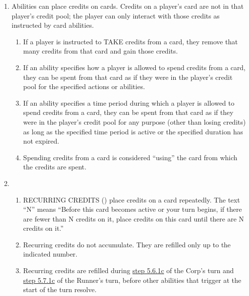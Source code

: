 \begin{enumerate}
\begin{enumerate}
	      \end{enumerate}
	\item Abilities can place credits on cards. Credits on a player's card are not in that player's credit pool; the player can only interact with those credits as instructed by card abilities.
	      \begin{enumerate}
		      \item If a player is instructed to TAKE credits from a card, they remove that many credits from that card and gain those credits.
		      \item If an ability specifies how a player is allowed to spend credits from a card, they can be spent from that card as if they were in the player's credit pool for the specified actions or abilities.
		      \item If an ability specifies a time period during which a player is allowed to spend credits from a card, they can be spent from that card as if they were in the player's credit pool for any purpose (other than losing credits) as long as the specified time period is active or the specified duration has not expired.
		      \item Spending credits from a card is considered ``using'' the card from which the credits are spent.
	      \end{enumerate}
	\item {}
	      \begin{enumerate}
		      \item RECURRING CREDITS (\recurring) place credits on a card repeatedly. The text ``N\recurring'' means ``Before this card becomes active or your turn begins, if there are fewer than N credits on it, place credits on this card until there are N credits on it.''
		      \item Recurring credits do not accumulate. They are refilled only up to the indicated number.
		      \item Recurring credits are refilled during \hyperlink{page.i}{step 5.6.1c} of the Corp's turn and \hyperlink{page.i}{step 5.7.1c} of the Runner's turn, before other abilities that trigger at the start of the turn resolve.\\[10pt]
	      \end{enumerate}
\end{enumerate}
